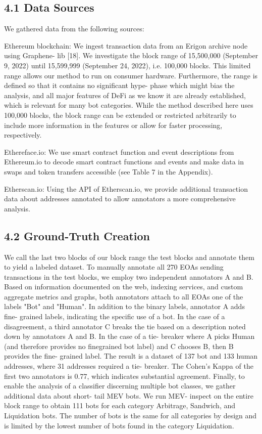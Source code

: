 \subsection*{4.1 Data Sources}

We gathered data from the following sources:

Ethereum blockchain: We ingest transaction data from an Erigon archive node using Graphene- lib [18]. We investigate the block range of 15,500,000 (September 9, 2022) until 15,599,999 (September 24, 2022), i.e. 100,000 blocks. This limited range allows our method to run on consumer hardware. Furthermore, the range is defined so that it contains no significant hype- phase which might bias the analysis, and all major features of DeFi as we know it are already established, which is relevant for many bot categories. While the method described here uses 100,000 blocks, the block range can be extended or restricted arbitrarily to include more information in the features or allow for faster processing, respectively.

Ethereface.io: We use smart contract function and event descriptions from Ethereum.io to decode smart contract functions and events and make data in swaps and token transfers accessible (see Table 7 in the Appendix).

Etherscan.io: Using the API of Etherscan.io, we provide additional transaction data about addresses annotated to allow annotators a more comprehensive analysis.

\subsection*{4.2 Ground-Truth Creation}

We call the last two blocks of our block range the test blocks and annotate them to yield a labeled dataset. To manually annotate all 270 EOAs sending transactions in the test blocks, we employ two independent annotators A and B. Based on information documented on the web, indexing services, and custom aggregate metrics and graphs, both annotators attach to all EOAs one of the labels "Bot" and "Human". In addition to the binary labels, annotator A adds fine- grained labels, indicating the specific use of a bot. In the case of a disagreement, a third annotator C breaks the tie based on a description noted down by annotators A and B. In the case of a tie- breaker where A picks Human (and therefore provides no finegrained bot label) and C chooses B, then B provides the fine- grained label. The result is a dataset of 137 bot and 133 human addresses, where 31 addresses required a tie- breaker. The Cohen's Kappa of the first two annotators is 0.77, which indicates substantial agreement. Finally, to enable the analysis of a classifier discerning multiple bot classes, we gather additional data about short- tail MEV bots. We run MEV- inspect on the entire block range to obtain 111 bots for each category Arbitrage, Sandwich, and Liquidation bots. The number of bots is the same for all categories by design and is limited by the lowest number of bots found in the category Liquidation.

